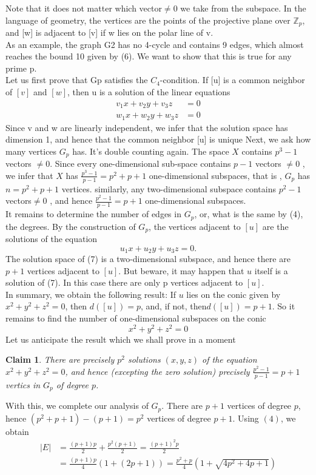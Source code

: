 \documentclass[10pt,twoside]{book}
\newtheorem*{claim}{Claim}
\begin{document}
		Note that it does not matter which vector$\neq{0}$ we take from the subspace. In the language of geometry, the vertices are the points of the projective plane over $\mathbb{Z}_p$, and [w] is adjacent to [v] if w lies on the polar line of v.\\
		As an example, the graph G2 has no 4-cycle and contains 9 edges, which almost reaches the bound 10 given by (6). We want to show that this is true for any prime p.\\
		Let us first prove that Gp satisfies the $C_4$-condition. If [u] is a common neighbor of $[v]$ and $[w]$, then u is a solution of the linear equations
		\begin{equation*}
			\begin{aligned}
				v_1x + v_2y + v_3z &= 0 \\
				w_1x + w_2y + w_3z &= 0
			\end{aligned}
		\end{equation*}
		Since v and w are linearly independent, we infer that the solution space has dimension 1, and hence that the common neighbor [u] is unique Next, we ask how many vertices $G_p$ has. It’s double counting again. The space $X$ contains $p^3-1$ vectors $\neq{0}.$ Since every one-dimensional sub-space contains $p-1$ vectors $\neq{0}$ , we infer that $X$ has $\frac{p^3 - 1}{p - 1} = p^2 + p + 1$ one-dimensional subspaces, that is , $G_p$ has $n = p^2 + p + 1 $ vertices. similarly, any two-dimensional subspace contains $p^2-1$ vectors$\neq{0}$ , and hence $\frac{p^2-1}{p-1} = p+1$  one-dimensional subspaces.\\
		It remains to determine the number of edges in $G_p$, or, what is the same by (4), the degrees. By the construction of $G_p$, the vertices adjacent to $[u]$ are the solutions of the equation 
		$$u_1x +  u_2y + u_3z = 0.$$
		The solution space of (7) is a two-dimensional subspace, and hence there are $p + 1$ vertices adjacent to $[u]$. But beware, it may happen that $u$ itself is a solution of (7). In this case there are only p vertices adjacent to $[u]$.\\
		In summary, we obtain the following result: If $u$ lies on the conic given by $x^2 + y^2 + z^2 = 0$, then $d([u]) = p$, and, if not, then$ d([u]) = p + 1$. So it remains to find the number of one-dimensional subspaces on the conic $$x^2 + y^2 + z^2 = 0$$
		Let us anticipate the result which we shall prove in a moment
		\begin{claim}
			There are precisely $p^2$ solutions $(x, y, z)$ of the equation $x^2 + y^2 + z^2 = 0$, and hence (excepting the zero solution) precisely $\frac{p^2-1}{p-1} = p+1$ vertics in $G_p$ of degree $p$.
		\end{claim}
		\noindent With this, we complete our analysis of $G_p$. There are $p + 1$ vertices of degree $p$, hence $(p^2 + p + 1) - (p + 1) = p^2$ vertices of degree $p + 1$. Using $(4)$, we obtain
		\begin{align*}
			|E| &= \frac{(p+1)p}{2} + \frac{p^2(p+1)}{2} = \frac{(p+1)^2 p}{2} \\  &=  \frac{(p+1)p}{4}(1+(2p+1)) = \frac{p^2 + p}{4}(1+\sqrt{4p^2 + 4p + 1})
		\end{align*}
		
\end{document}
